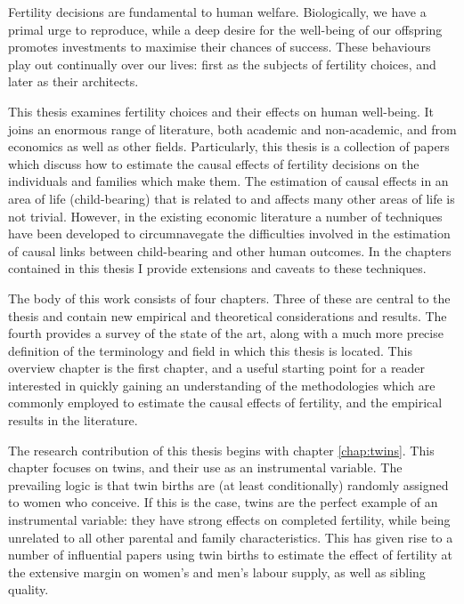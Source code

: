 Fertility decisions are fundamental to human welfare. Biologically, we have a 
primal urge %
to reproduce, while a deep desire for the well-being of our offspring promotes 
investments to maximise their chances of success.  These behaviours play out 
continually over our lives: first as the subjects of fertility choices, and 
later as their architects.

This thesis examines fertility choices and their effects on human well-being.
It joins an enormous range of literature, both academic and non-academic, and
from economics as well as other fields.  Particularly, this thesis is a 
collection of papers which discuss how to estimate the causal effects of
fertility decisions on the individuals and families which make them.  The 
estimation of causal effects in an area of life (child-bearing) that is related 
to and affects many other areas of life is not trivial.  However, in the 
existing economic literature a number of techniques have been developed to 
circumnavegate the difficulties involved in the estimation of causal links
between child-bearing and other human outcomes.  In the chapters contained in 
this thesis I provide extensions and caveats to these techniques.

The body of this work consists of four chapters.  Three of these are central
to the thesis and contain new empirical and theoretical considerations and 
results.  The fourth provides a survey of the state of the art,
along with a much more precise definition of the terminology and field in
which this thesis is located.  This overview chapter is the first chapter,
and a useful starting point for a reader interested in quickly gaining an
understanding of the methodologies which are commonly employed to estimate the
causal effects of fertility, and the empirical results in the literature.

The research contribution of this thesis begins with chapter \ref{chap:twins}.
This chapter focuses on twins, and their use as an instrumental variable. The
prevailing logic is that twin births are (at least conditionally) randomly 
assigned to women who conceive.  If this is the case, twins are the perfect
example of an instrumental variable: they have strong effects on completed
fertility, while being unrelated to all other parental and family 
characteristics.  This has given rise to a number of influential papers using
twin births to estimate the effect of fertility at the extensive margin on
women's and men's labour supply, as well as sibling quality.

